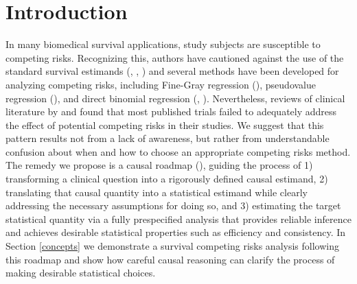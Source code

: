 \documentclass{report}
\newcommand{\1}{\ensuremath{\mathbf{1}}}
\begin{document}
\section{Introduction}
\label{intro}
In many biomedical survival applications, study subjects are susceptible to competing risks. Recognizing this, authors have cautioned against the use of the standard survival estimands (\cite{andersen_competing_2012}, \cite{koller_competing_2012}, \cite{austin_accounting_2017}) and several methods have been developed for analyzing competing risks, including Fine-Gray regression (\cite{fine_proportional_1999}), pseudovalue regression (\cite{klein_regression_2005}), and direct binomial regression (\cite{scheike_predicting_2008}, \cite{gerds_absolute_2012}). Nevertheless, reviews of clinical literature by \cite{koller_competing_2012} and \cite{austin_accounting_2017} found that most published trials failed to adequately address the effect of potential competing risks in their studies. We suggest that this pattern results not from a lack of awareness, but rather from understandable confusion about when and how to choose an appropriate competing risks method. The remedy we propose is a causal roadmap (\cite{petersen_causal_2014}), guiding the process of 1) transforming a clinical question into a rigorously defined causal estimand, 2) translating that causal quantity into a statistical estimand while clearly addressing the necessary assumptions for doing so, and 3) estimating the target statistical quantity via a fully prespecified analysis that provides reliable inference and achieves desirable statistical properties such as efficiency and consistency. In Section \ref{concepts} we demonstrate a survival competing risks analysis following this roadmap and show how careful causal reasoning can clarify the process of making desirable statistical choices.
\end{document}
